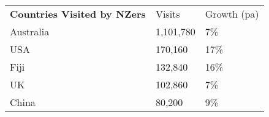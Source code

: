 \begin{tabular}[t]{p{4.8cm}>{\hfill}p{1.3cm}>{\hfill}p{1.4cm}}
 \textbf{Countries Visited by NZers} & Visits & Growth (pa) \\ 
 Australia & 1,101,780 & 7\% \\ 
  USA &   170,160 & 17\% \\ 
  Fiji &   132,840 & 16\% \\ 
  UK &   102,860 & 7\% \\ 
  China &    80,200 & 9\% \\ 
  \end{tabular}
